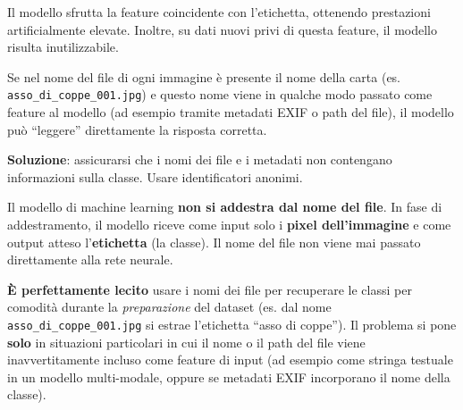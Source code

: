 \documentclass[a4paper,12pt]{article}
\begin{document}
Il modello sfrutta la feature coincidente con l'etichetta, ottenendo prestazioni artificialmente elevate. Inoltre, su dati nuovi privi di questa feature, il modello risulta inutilizzabile.

\begin{esempio}
Se nel nome del file di ogni immagine è presente il nome della carta (es. \texttt{asso\_di\_coppe\_001.jpg}) e questo nome viene in qualche modo passato come feature al modello (ad esempio tramite metadati EXIF o path del file), il modello può ``leggere'' direttamente la risposta corretta.

\textbf{Soluzione}: assicurarsi che i nomi dei file e i metadati non contengano informazioni sulla classe. Usare identificatori anonimi.
\end{esempio}

\begin{attenzione}[title=Chiarimento importante: nomi dei file ed etichette]
Il modello di machine learning \textbf{non si addestra dal nome del file}. In fase di addestramento, il modello riceve come input solo i \textbf{pixel dell'immagine} e come output atteso l'\textbf{etichetta} (la classe). Il nome del file non viene mai passato direttamente alla rete neurale.

\textbf{È perfettamente lecito} usare i nomi dei file per recuperare le classi per comodità durante la \emph{preparazione} del dataset (es. dal nome \texttt{asso\_di\_coppe\_001.jpg} si estrae l'etichetta ``asso di coppe''). Il problema si pone \textbf{solo} in situazioni particolari in cui il nome o il path del file viene inavvertitamente incluso come feature di input (ad esempio come stringa testuale in un modello multi-modale, oppure se metadati EXIF incorporano il nome della classe).


\end{attenzione}
\end{document}
